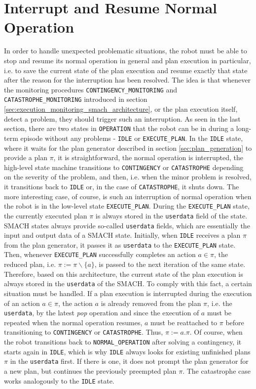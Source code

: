 \documentclass[english, master, utf8]{base/thesis_KBS}
\newcommand{\code}[1]{\colorbox{light-gray}{\texttt{#1}}}
\begin{document}
\section{Interrupt and Resume Normal Operation}

In order to handle unexpected problematic situations, the robot must be able to stop and resume its normal operation in general
and plan execution in particular, i.e. to save the current state of the plan execution and resume exactly that state after the reason
for the interruption has been resolved. The idea is that whenever the monitoring procedures \code{CONTINGENCY\_MONITORING} and \code{CATASTROPHE\_MONITORING} 
introduced in section \ref{sec:execution_monitoring_smach_architecture}, or the plan execution itself, detect a problem, they should trigger such an interruption.
As seen in the last section, there are two states in \code{OPERATION} that the robot can be in during a long-term episode without any problems
- \code{IDLE} or \code{EXECUTE\_PLAN}. In the \code{IDLE} state, where it waits for the plan generator described in section \ref{sec:plan_generation} to provide a plan $\pi$,
it is straightforward, the normal operation is interrupted, the high-level state machine transitions to \code{CONTINGENCY} or \code{CATASTROPHE} depending
on the severity of the problem, and then, i.e. when the minor problem is resolved, it transitions back to \code{IDLE} or, in the case of \code{CATASTROPHE},
it shuts down. The more interesting case, of course, is such an interruption of normal operation when the robot is in the low-level state \code{EXECUTE\_PLAN}.
During the \code{EXECUTE\_PLAN} state, the currently executed plan $\pi$ is always stored in the \code{userdata} field of the state.
SMACH states always provide so-called \code{userdata} fields, which are essentially the input and output data of a SMACH state.
Initially, when \code{IDLE} receives a plan $\pi$ from the plan generator, it passes it as \code{userdata} to the \code{EXECUTE\_PLAN} state. Then, whenever \code{EXECUTE\_PLAN}
successfully completes an action $a \in \pi$, the reduced plan, i.e. $\pi := \pi \backslash \{a\}$, is passed to the next iteration of the same state.
Therefore, based on this architecture, the current state of the plan execution is always stored in the \code{userdata} of the SMACH. To comply with this fact, a certain situation
must be handled. If a plan execution is interrupted during the execution of an action $a \in \pi$, the action $a$ is already removed from the plan $\pi$, i.e. the \code{userdata},
by the latest \textit{pop} operation and since the execution of $a$ must be repeated when the normal operation resumes, $a$ must be reattached to $\pi$ before transitioning
to \code{CONTINGENCY} or \code{CATASTROPHE}. Thus, $\pi := a.\pi$.
Of course, when the robot transitions back to \code{NORMAL\_OPERATION} after solving a contingency, it starts again in \code{IDLE}, which is why \code{IDLE}
always looks for existing unfinished plans $\pi$ in the \code{userdata} first. If there is one, it does not prompt the plan generator for a new plan, but continues the previously
preempted plan $\pi$. The catastrophe case works analogously to the \code{IDLE} state.
\end{document}
